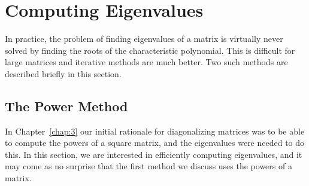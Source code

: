 \section{Computing Eigenvalues}
\label{sec:8_5}

In practice, the problem of finding 
eigenvalues of a matrix is virtually never solved by finding the roots 
of the characteristic polynomial. This is difficult for large matrices 
and iterative methods are much better. Two such methods are described 
briefly in this section.


\subsection*{The Power Method}

In Chapter~\ref{chap:3}
 our initial rationale for diagonalizing matrices was to be able to 
compute the powers of a square matrix, and the eigenvalues were needed 
to do this. In this section, we are interested in efficiently computing 
eigenvalues, and it may come as no surprise that the first method we 
discuss uses the powers of a matrix.


